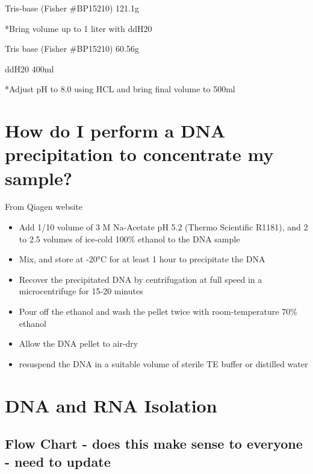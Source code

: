 \documentclass[11pt, oneside]{article}
\begin{document}
		\vspace{5mm}


			Tris-base 		(Fisher \#BP15210) \hspace{5mm}	121.1g

			*Bring volume up to 1 liter with ddH20

		\vspace{5mm}


			Tris base (Fisher  \#BP15210)		60.56g

			ddH20						400ml

			*Adjust pH to 8.0 using HCL and bring final volume to 500ml


	\newpage


\section{How do I perform a DNA precipitation to concentrate my sample?}
From Qiagen website
  \begin{itemize}
    \item Add 1/10 volume of 3 M Na-Acetate pH 5.2 (Thermo Scientific R1181), and 2 to 2.5 volumes of ice-cold 100\% ethanol to the DNA sample
    \item Mix, and store at -20°C for at least 1 hour to precipitate the DNA
    \item Recover the precipitated DNA by centrifugation at full speed in a microcentrifuge for 15-20 minutes
    \item Pour off the ethanol and wash the pellet twice with room-temperature 70\% ethanol
    \item Allow the DNA pellet to air-dry
    \item resuspend the DNA in a suitable volume of sterile TE buffer or distilled water
    \end{itemize}

\section{DNA and RNA Isolation}

	\subsection{ Flow Chart - does this make sense to everyone - need to update}

		\vspace{5mm}
\end{document}
